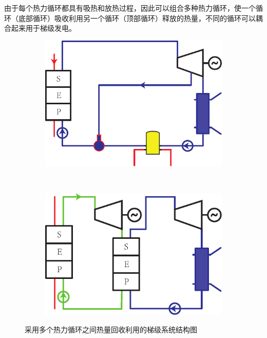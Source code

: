 由于每个热力循环都具有吸热和放热过程，因此可以组合多种热力循环，使一个循环（底部循环）吸收利用另一个循环（顶部循环）释放的热量，不同的循环可以耦合起来用于梯级发电。
\begin{figure}[htbp]
\centering
	\begin{subfigure}[b]{0.4\columnwidth}
	\includegraphics[width = \columnwidth]{fig/Stirling-Rankine}
	\caption{}\label{fig:Stirling-Rankine}
	\end{subfigure}
	~
\begin{subfigure}[b]{0.4\columnwidth}
	\includegraphics[width = \columnwidth]{fig/SeriesRankine}
	\caption{}\label{fig:Rankine-Rankine}
	\end{subfigure}
	\caption{采用多个热力循环之间热量回收利用的梯级系统结构图}
	\label{fig:coupledCycles}
\end{figure}

